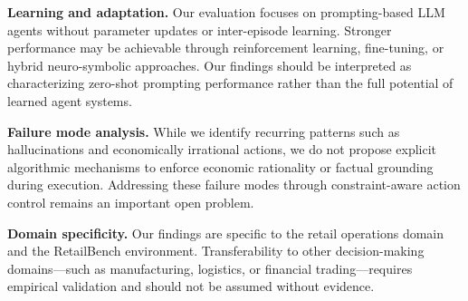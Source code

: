 \textbf{Learning and adaptation.} Our evaluation focuses on prompting-based LLM agents without parameter updates or inter-episode learning. Stronger performance may be achievable through reinforcement learning, fine-tuning, or hybrid neuro-symbolic approaches. Our findings should be interpreted as characterizing zero-shot prompting performance rather than the full potential of learned agent systems.

\textbf{Failure mode analysis.} While we identify recurring patterns such as hallucinations and economically irrational actions, we do not propose explicit algorithmic mechanisms to enforce economic rationality or factual grounding during execution. Addressing these failure modes through constraint-aware action control remains an important open problem.

\textbf{Domain specificity.} Our findings are specific to the retail operations domain and the RetailBench environment. Transferability to other decision-making domains---such as manufacturing, logistics, or financial trading---requires empirical validation and should not be assumed without evidence.